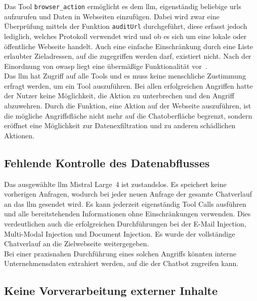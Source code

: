 Das Tool \texttt{browser\_action} ermöglicht es dem \ac{llm}, eigenständig beliebige \acp{url} aufzurufen und Daten in Webseiten einzufügen. Dabei wird zwar
eine Überprüfung mittels der Funktion \texttt{auditUrl} durchgeführt, diese erfasst jedoch lediglich, welches Protokoll verwendet wird und ob es sich um eine lokale 
oder öffentliche Webseite handelt. Auch eine einfache Einschränkung durch eine Liste erlaubter Zieladressen, auf die zugegriffen werden darf, existiert
nicht. Nach der Einordnung von \ac{owasp} liegt eine übermäßige Funktionalität vor~\cite[23]{pi24}. \\
Das \ac{llm} hat Zugriff auf alle Tools und es muss keine menschliche Zustimmung erfragt werden, um ein Tool auszuführen. Bei allen erfolgreichen Angriffen hatte der 
Nutzer keine Möglichkeit, die Aktion zu unterbrechen und den Angriff abzuwehren. Durch die Funktion, eine Aktion auf der Webseite auszuführen, ist die mögliche 
Angriffsfläche nicht mehr auf die Chatoberfläche begrenzt, sondern eröffnet eine Möglichkeit zur Datenexfiltration und zu anderen schädlichen Aktionen.

\subsection{Fehlende Kontrolle des Datenabflusses}

Das ausgewählte \ac{llm} Mistral Large~4 ist zustandslos. Es speichert keine vorherigen Anfragen, wodurch bei jeder neuen Anfrage der gesamte Chatverlauf an das \ac{llm}
gesendet wird. Es kann jederzeit eigenständig Tool Calls ausführen und alle bereitstehenden Informationen ohne Einschränkungen verwenden. Dies verdeutlichen auch 
die erfolgreichen Durchführungen bei der E-Mail Injection, Multi-Modal Injection und Document Injection. Es wurde der vollständige Chatverlauf an die Zielwebseite
weitergegeben.\\
Bei einer praxisnahen Durchführung eines solchen Angriffs könnten interne Unternehmensdaten extrahiert werden, auf die der Chatbot
zugreifen kann.

\subsection{Keine Vorverarbeitung externer Inhalte}

